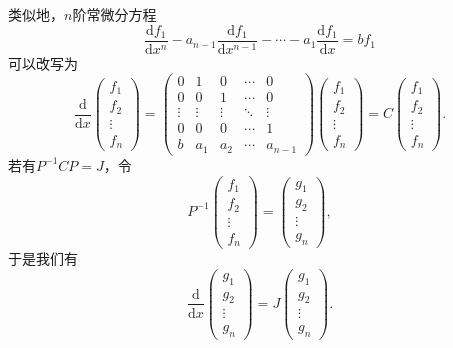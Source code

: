 类似地，$n$阶常微分方程
\[\dfrac{\mathrm{d}f_1}{\mathrm{d}x^n}-a_{n-1}\dfrac{\mathrm{d}f_1}{\mathrm{d}x^{n-1}}-\cdots-a_1\dfrac{\mathrm{d}f_1}{\mathrm{d}x}=bf_1\]
可以改写为
\[\dfrac{\mathrm{d}}{\mathrm{d}x}\begin{pmatrix}
    f_1 \\ f_2 \\ \vdots \\ f_n
\end{pmatrix}=\begin{pmatrix}
    0 & 1 & 0 & \cdots & 0 \\
    0 & 0 & 1 & \cdots & 0 \\
    \vdots & \vdots & \vdots & \ddots & \vdots \\
    0 & 0 & 0 & \cdots & 1 \\
    b & a_1 & a_2 & \cdots & a_{n-1}
\end{pmatrix}\begin{pmatrix}
    f_1 \\ f_2 \\ \vdots \\ f_n
\end{pmatrix}=C\begin{pmatrix}
    f_1 \\ f_2 \\ \vdots \\ f_n
\end{pmatrix}.\]
若有$P^{-1}CP=J$，令
\[P^{-1}\begin{pmatrix}
    f_1 \\ f_2 \\ \vdots \\ f_n
\end{pmatrix}=\begin{pmatrix}
    g_1 \\ g_2 \\ \vdots \\ g_n
\end{pmatrix},\]
于是我们有
\[\dfrac{\mathrm{d}}{\mathrm{d}x}\begin{pmatrix}
    g_1 \\ g_2 \\ \vdots \\ g_n
\end{pmatrix}=J\begin{pmatrix}
    g_1 \\ g_2 \\ \vdots \\ g_n
\end{pmatrix}.\]

